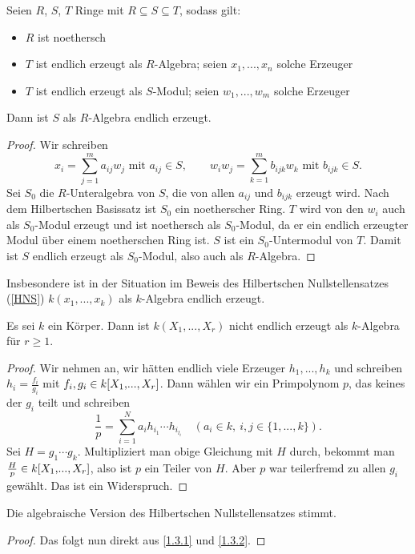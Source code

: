 \documentclass[a4paper,12pt]{scrbook}
\theoremstyle{keinenummern} %
\theoremstyle{mitnummern}
\theoremstyle{unserbeweis}
\newtheorem{proof}{Beweis}
\renewcommand{\dotsc}{\ensuremath{\!...}}
\newcommand{\polyx}[1][n]{\ensuremath%
  [X_{1},\dotsc,X_{#1}]}
\begin{document}
\begin{lem}\label{1.3.1}
  Seien $R$, $S$, $T$ Ringe mit $R\subseteq S\subseteq T$, sodass gilt:
  \begin{itemize}
  \item $R$ ist noethersch
  \item $T$ ist endlich erzeugt als $R$-Algebra; seien $x_1,\dotsc,x_n$ solche Erzeuger
  \item $T$ ist endlich erzeugt als $S$-Modul; seien $w_1,\dotsc,w_m$ solche Erzeuger
  \end{itemize}
  Dann ist $S$ als $R$-Algebra endlich erzeugt.
\end{lem}
\begin{proof}
  Wir schreiben 
  \[ x_i=\displaystyle\sum_{j=1}^m a_{ij}w_j \text{ mit } a_{ij}\in S, \qquad
     w_iw_j=\displaystyle\sum_{k=1}^m b_{ijk}w_k \text { mit } b_{ijk}\in S. \]
  Sei $S_0$ die $R$-Unteralgebra von $S$, die von allen $a_{ij}$ und $b_{ijk}$ erzeugt wird. Nach dem Hilbertschen Basissatz ist
  $S_0$ ein noetherscher Ring. $T$ wird von den $w_i$ auch als $S_0$-Modul erzeugt und ist noethersch als $S_0$-Modul, da er ein
  endlich erzeugter Modul über einem noetherschen Ring ist. $S$ ist ein $S_0$-Untermodul von $T$. Damit ist $S$ endlich erzeugt
  als $S_0$-Modul, also auch als $R$-Algebra.
\end{proof}

Insbesondere ist in der Situation im Beweis des Hilbertschen Nullstellensatzes (\cref{HNS}) $k(x_1,\dotsc,x_k)$ als
$k$-Algebra endlich erzeugt.

\begin{lem}\label{1.3.2}
  Es sei $k$ ein Körper. Dann ist $k(X_1,\dotsc,X_r)$ nicht endlich erzeugt als $k$-Algebra für $r\ge1$.
\end{lem}
\begin{proof}
  Wir nehmen an, wir hätten endlich viele Erzeuger $h_1,\dotsc,h_k$ und schreiben $h_i=\frac{f_i}{g_i}$ mit $f_i,g_i\in
  k\polyx[r]$. Dann wählen wir ein Primpolynom $p$, das keines der $g_i$ teilt und schreiben
  \[ \frac1p = \sum_{i=1}^N a_i h_{i_1}\dotsm h_{i_{l_i}} \quad (a_i\in k,\ i,j\in\{1,\dotsc,k\}). \]
  Sei $H=g_1\dotsm g_k$. Multipliziert man obige Gleichung mit $H$ durch, bekommt man $\frac{H}{p}\in k\polyx[r]$, also
  ist $p$ ein Teiler von $H$. Aber $p$ war teilerfremd zu allen $g_i$ gewählt. Das ist ein Widerspruch.
\end{proof}

\begin{prop}\label{1.3.3}
  Die algebraische Version des Hilbertschen Nullstellensatzes stimmt.
\end{prop}
\begin{proof}
  Das folgt nun direkt aus \cref{1.3.1} und \cref{1.3.2}.
\end{proof}
\end{document}
